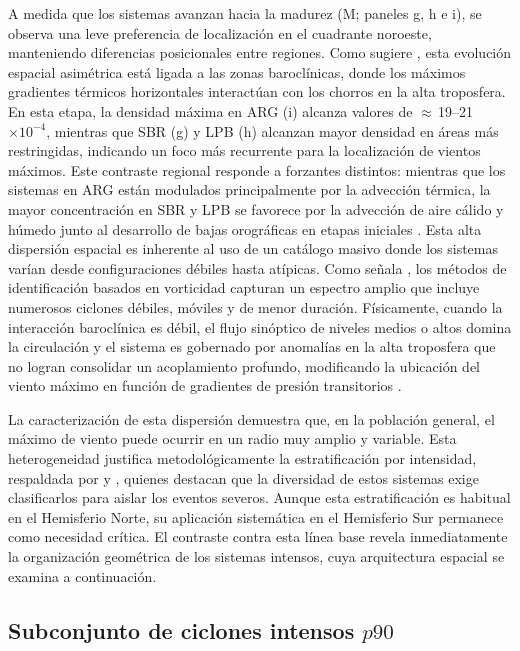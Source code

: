 A medida que los sistemas avanzan hacia la madurez (M; paneles g, h e i), se observa una leve preferencia de localización en el cuadrante noroeste, manteniendo diferencias posicionales entre regiones. 
Como sugiere \citet{dossantos2023response}, esta evolución espacial asimétrica está ligada a las zonas baroclínicas, donde los máximos gradientes térmicos horizontales interactúan con los chorros en la alta troposfera.
En esta etapa, la densidad máxima en ARG (i) alcanza valores de $\approx$\,19--21 $\times 10^{-4}$, mientras que SBR (g) y LPB (h) alcanzan mayor densidad en áreas más restringidas, indicando un foco más recurrente para la localización de vientos máximos. 
Este contraste regional responde a forzantes distintos: mientras que los sistemas en ARG están modulados principalmente por la advección térmica, la mayor concentración en SBR y LPB se favorece por la advección de aire cálido y húmedo junto al desarrollo de bajas orográficas en etapas iniciales \citep{gramcianinov2019properties, cardoso2022synoptic}.
Esta alta dispersión espacial es inherente al uso de un catálogo masivo donde los sistemas varían desde configuraciones débiles hasta atípicas. 
Como señala \citet{sinclair1994objective}, los métodos de identificación basados en vorticidad capturan un espectro amplio que incluye numerosos ciclones débiles, móviles y de menor duración. 
Físicamente, cuando la interacción baroclínica es débil, el flujo sinóptico de niveles medios o altos domina la circulación y el sistema es gobernado por anomalías en la alta troposfera que no logran consolidar un acoplamiento profundo, modificando la ubicación del viento máximo en función de gradientes de presión transitorios \citep{hoskins2005new}.

La caracterización de esta dispersión demuestra que, en la población general, el máximo de viento puede ocurrir en un radio muy amplio y variable. 
Esta heterogeneidad justifica metodológicamente la estratificación por intensidad, respaldada por \citet{corner2025classification} y \citet{eisenstein2023identification}, quienes destacan que la diversidad de estos sistemas exige clasificarlos para aislar los eventos severos. 
Aunque esta estratificación es habitual en el Hemisferio Norte, su aplicación sistemática en el Hemisferio Sur permanece como necesidad crítica. 
El contraste contra esta línea base revela inmediatamente la organización geométrica de los sistemas intensos, cuya arquitectura espacial se examina a continuación.

\subsection{Subconjunto de ciclones intensos $p90$}\label{sec:kde_espacial_p90}

